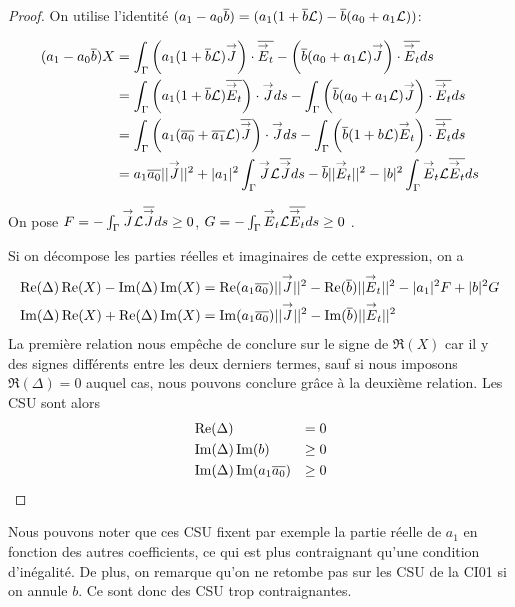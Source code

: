       \begin{proof}
        On utilise l'identité \((a_1-a_0\conj{b}) = (a_1(1+\conj{b}\LL) - \conj{b}(a_0+a_1\LL))\):

        \begin{align*}
          (a_1-a_0\conj{b})X &= \int_\Gamma \left(a_1(1+\conj{b}\LL) \vJ\right)\cdot\conj{\vE_t} - \left(\conj{b}(a_0+a_1 \LL)\vJ\right)\cdot\conj{\vE_t} ds\\
          &= \int_\Gamma \left(a_1(1+\conj{b}\LL) \conj{\vE_t}\right)\cdot\vJ ds - \int_\Gamma \left(\conj{b}(a_0+a_1 \LL)\vJ\right)\cdot\conj{\vE_t} ds\\
          &= \int_\Gamma \left(a_1(\conj{a_0}+\conj{a_1}\LL) \conj{\vJ}\right)\cdot\vJ ds  - \int_\Gamma \left(\conj{b}(1+b \LL)\vE_t\right)\cdot\conj{\vE_t} ds\\
          &= a_1\conj{a_0} ||\vJ||^2 + |a_1|^2 \int_\Gamma \vJ \LL \conj{\vJ} ds - \conj{b} ||\vE_t||^2 - |b|^2 \int_\Gamma \vE_t \LL \conj{\vE_t} ds
        \end{align*}

        On pose \(F = -\int_\Gamma \vJ \LL \conj{\vJ} ds \ge 0 \), \(G = -\int_\Gamma \vE_t \LL \conj{\vE_t} ds \ge 0 \) .

        Si on décompose les parties réelles et imaginaires de cette expression, on a
        \begin{align*}
          \Re(\Delta)\Re(X) - \Im(\Delta)\Im(X) &= \Re(a_1\conj{a_0}) ||\vJ||^2 - \Re(\conj{b})||\vE_t||^2 -|a_1|^2 F + |b|^2 G \\
          \Im(\Delta)\Re(X) + \Re(\Delta)\Im(X) &= \Im(a_1\conj{a_0}) ||\vJ||^2 - \Im(\conj{b})||\vE_t||^2
        \end{align*}
        La première relation nous empêche de conclure sur le signe de \(\Re(X)\) car il y des signes différents entre les deux derniers termes, sauf si nous imposons \(\Re(\Delta)= 0\) auquel cas, nous pouvons conclure grâce à la deuxième relation. Les CSU sont alors
        \begin{align}
          &\Re(\Delta) &= 0\\
          &\Im(\Delta)\Im(b) &\ge 0\\
          &\Im(\Delta)\Im(a_1\conj{a_0})&\ge 0
        \end{align}
      \end{proof}

      Nous pouvons noter que ces CSU fixent par exemple la partie réelle de \(a_1\) en fonction des autres coefficients, ce qui est plus contraignant qu'une condition d'inégalité. De plus, on remarque qu'on ne retombe pas sur les CSU de la CI01 si on annule \(b\). Ce sont donc des CSU trop contraignantes.
    
